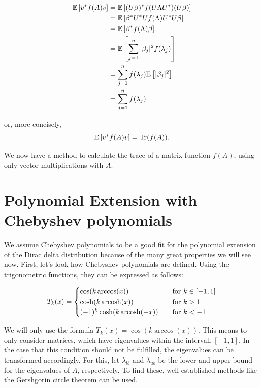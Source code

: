 \begin{align*}
    \mathbb{E}\left[v^* f(A) v\right] &= \mathbb{E}\left[(U\beta)^* f(U\Lambda U^*) (U\beta)\right] \\
        &= \mathbb{E}\left[\beta^* U^* U f(\Lambda) U^* U \beta\right] \\
        &= \mathbb{E}\left[\beta^* f(\Lambda) \beta\right] \\
        &= \mathbb{E}\left[\sum_{j = 1}^n |\beta_j|^2 f(\lambda_j) \right] \\
        &= \sum_{j = 1}^n f(\lambda_j) \mathbb{E}\left[ |\beta_j|^2 \right] \\
        &= \sum_{j = 1}^n f(\lambda_j)
\end{align*}

or, more concisely,
\begin{equation} \label{eq:theorem_result}
    \mathbb{E}\left[v^* f(A) v\right] = \operatorname{Tr}(f(A)).
\end{equation}

We now have a method to calculate the trace of a matrix function $f(A)$,
using only vector multiplications with $A$.

\section{Polynomial Extension with Chebyshev polynomials}
We assume Chebyshev polynomials to be a good fit for the polynomial extension of the Dirac delta distribution
because of the many great properties we will see now. First, let's look how Chebyshev polynomials are defined.
Using the trigonometric functions, they can be expressed as follows:

\[ T_k(x) =
\begin{cases}

\cos(k \arccos(x))                & \quad \text{for } k \in [-1, 1]\\
    \cosh(k \operatorname{arcosh}(x))           & \quad \text{for } k > 1\\
    (-1)^k \cosh(k \operatorname{arcosh}(-x))   & \quad \text{for } k < -1
\end{cases}
\]

We will only use the formula $T_k(x) = \cos(k \arccos(x))$.
This means to only consider matrices, which have eigenvalues within the intervall $[-1, 1]$.
In the case that this condition should not be fulfilled, the eigenvalues can be transformed accordingly.
For this, let $\lambda_{lb}$ and $\lambda_{ub}$ be the lower and upper bound for the eigenvalues of $A$, respectively.
To find these, well-established methods like the Gershgorin circle theorem can be used.

